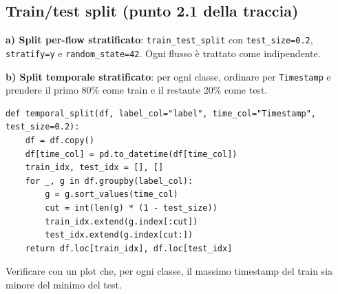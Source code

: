 \subsection{Train/test split (punto 2.1 della traccia)}
\begin{strategia}
\textbf{a) Split per-flow stratificato}: \texttt{train\_test\_split} con \texttt{test\_size=0.2}, \texttt{stratify=y} e \texttt{random\_state=42}. Ogni flusso è trattato come
indipendente.

\textbf{b) Split temporale stratificato}: per ogni classe, ordinare per
\texttt{Timestamp} e prendere il primo 80\% come train e il restante 20\% come
test.
\end{strategia}

\begin{lstlisting}[style=ddos]
def temporal_split(df, label_col="label", time_col="Timestamp", test_size=0.2):
    df = df.copy()
    df[time_col] = pd.to_datetime(df[time_col])
    train_idx, test_idx = [], []
    for _, g in df.groupby(label_col):
        g = g.sort_values(time_col)
        cut = int(len(g) * (1 - test_size))
        train_idx.extend(g.index[:cut])
        test_idx.extend(g.index[cut:])
    return df.loc[train_idx], df.loc[test_idx]
\end{lstlisting}

Verificare con un plot che, per ogni classe, il massimo timestamp del train sia
minore del minimo del test.

